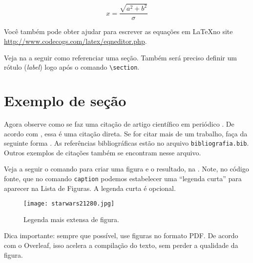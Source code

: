 \begin{equation}
x=\frac{\sqrt{a^{2}+b^{2}}}{\sigma}
\label{eq:teste}
\end{equation}

Você também pode obter ajudar para escrever as equações em \LaTeX no site \url{http://www.codecogs.com/latex/eqneditor.php}.



Veja na  a seguir como referenciar uma seção. Também será preciso definir um rótulo (\textit{label}) logo após o comando \texttt{\textbackslash section}.

\section{Exemplo de seção}\label{sec:exemplo_secao} 
Agora observe como se faz uma citação de artigo científico em periódico \cite{Gradvohl2014c}. De acordo com \textcite{Gradvohl2016}, essa é uma citação direta. Se for citar mais de um trabalho, faça da seguinte forma \cite{Caldana2017,Gradvohl2015}. As referências bibliográficas estão no arquivo \texttt{bibliografia.bib}. Outros exemplos de citações também se encontram nesse arquivo.

Veja a seguir o comando para criar uma figura e o resultado, na . Note, no código fonte, que no comando \texttt{caption} podemos estabelecer uma \enquote{legenda curta} para aparecer na Lista de Figuras. A legenda curta é opcional.

\begin{figure}[!htb]
\centering
\texttt{[image: starwars21280.jpg]}
\caption[Legenda curta de figura]{Legenda mais extensa de figura.}
\label{fig:xwing}
\end{figure}

Dica importante: sempre que possível, use figuras no formato PDF. De acordo com o Overleaf, isso acelera a compilação do texto, sem perder a qualidade da figura.

